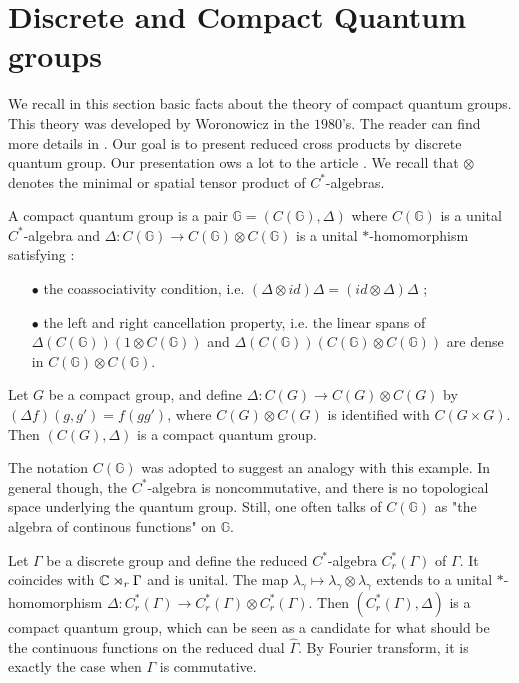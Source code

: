 \section{Discrete and Compact Quantum groups}

We recall in this section basic facts about the theory of compact quantum groups. This theory was developed by Woronowicz in the $1980$'s. The reader can find more details in \cite{Wo}. Our goal is to present reduced cross products by discrete quantum group. Our presentation ows a lot to the article \cite{VerVaes}. We recall that $\otimes$ denotes the minimal or spatial tensor product of $C^*$-algebras.

\begin{definition}
A compact quantum group is a pair $\mathbb G = (C(\mathbb G),\Delta)$ where $C(\mathbb G)$ is a unital $C^*$-algebra and $\Delta : C(\mathbb G) \rightarrow C(\mathbb G)\otimes C(\mathbb G)$ is a unital $*$-homomorphism satisfying :
\begin{itemize}
\item[$\bullet$] the coassociativity condition, i.e. $(\Delta \otimes id)\Delta=(id\otimes \Delta )\Delta$ ;
\item[$\bullet$] the left and right cancellation property, i.e. the linear spans of $\Delta(C(\mathbb G))(1\otimes C(\mathbb G))$ and $\Delta(C(\mathbb G))(C(\mathbb G)\otimes C(\mathbb G))$ are dense in $C(\mathbb G)\otimes C(\mathbb G)$.
\end{itemize} 
\end{definition}

\begin{Expl} Let $G$ be a compact group, and define $\Delta : C(G)\rightarrow C(G)\otimes C(G)$ by $(\Delta f)(g,g') = f(gg')$, where $C(G)\otimes C(G)$ is identified with $C(G\times G)$. Then $(C(G),\Delta ) $ is a compact quantum group.
\end{Expl}

The notation $C(\mathbb G)$ was adopted to suggest an analogy with this example. In general though, the $C^*$-algebra is noncommutative, and there is no topological space underlying the quantum group. Still, one often talks of $C(\mathbb G)$ as "the algebra of continous functions" on $\mathbb G$.

\begin{Expl}
Let $\Gamma$ be a discrete group and define the reduced $C^*$-algebra $C_r^*(\Gamma)$ of $\Gamma$. It coincides with $\mathbb C\rtimes_r \Gamma$ and is unital. The map $ \lambda_\gamma \mapsto \lambda_\gamma\otimes \lambda_\gamma$ extends to a unital $*$-homomorphism $\Delta :C_r^*(\Gamma)\rightarrow C_r^*(\Gamma)\otimes C_r^*(\Gamma) $. Then $(C_r^*(\Gamma),\Delta)$ is a compact quantum group, which can be seen as a candidate for what should be the continuous functions on the reduced dual $\hat\Gamma$. By Fourier transform, it is exactly the case when $\Gamma$ is commutative.
\end{Expl}

